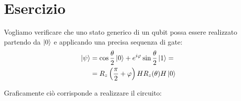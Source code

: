 \documentclass[../../InformazioneQuantistica.tex]{subfiles}
\begin{document}
\section{Esercizio \theEsercizio}
Vogliamo verificare che uno stato generico di un qubit possa essere realizzato partendo da $\Ket{0}$ e applicando una precisa sequenza di gate:
\begin{align*}
\Ket{\psi} &= \cos\frac{\theta}{2} \Ket{0} + e^{i\varphi} \sin\frac{\theta}{2}\Ket{1}=\\
&= R_z\left(\frac{\pi}{2}+\varphi\right)HR_z(\theta) H \Ket{0}
\end{align*}

Graficamente ciò corrisponde a realizzare il circuito:


\end{document}
